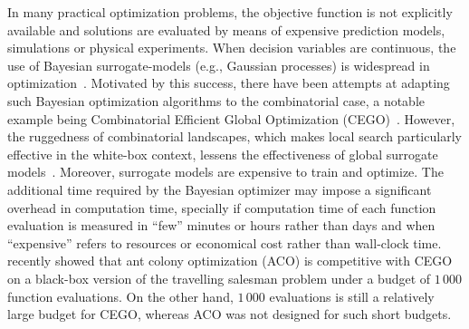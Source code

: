 \documentclass[runningheads]{llncs}
\begin{document}
In many practical optimization problems, the objective function is not
explicitly available and solutions are evaluated by means of expensive
prediction models, simulations or physical experiments. When decision variables
are continuous, the use of Bayesian surrogate-models (e.g., Gaussian processes)
is widespread in
optimization~\citep{JonSchWel98go,ForKea2009surrogate}. Motivated by this
success, there have been attempts at adapting such Bayesian optimization
algorithms to the combinatorial case, a notable example being Combinatorial
Efficient Global Optimization
(CEGO)~\citep{ZaeStoBar2014:ppsn,ZaeStoFriFisNauBar2014}. However, the
ruggedness of combinatorial landscapes, which makes local search particularly
effective in the white-box context, lessens the effectiveness of global
surrogate models~\citep{EriPeaGar2019scalable}. Moreover, surrogate models are
expensive to train and optimize. The additional time required by the Bayesian
optimizer may impose a significant overhead in computation time, specially if
computation time of each function evaluation is measured in ``few'' minutes or
hours rather than days and when ``expensive'' refers to resources or economical
cost rather than wall-clock time. \citet{PerLopStu2015si} recently showed that
ant colony optimization (ACO) %
is competitive with CEGO
on a black-box version of the travelling salesman problem under a budget of
$1\,000$ function evaluations.  On the other hand, $1\,000$ evaluations is
still a relatively large budget for CEGO, whereas ACO was not designed for such
short budgets.
\end{document}
